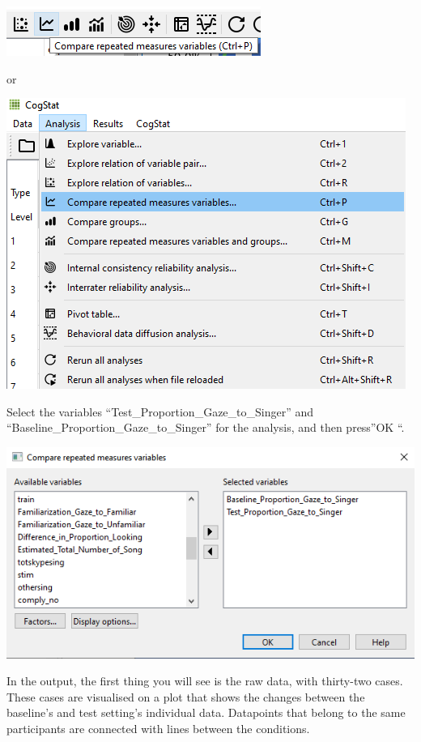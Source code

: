 \documentclass[
]{book}
\begin{document}
\includegraphics{img/ch6/6.7comparerepeatedmeasures_icon.png}

or

\includegraphics{img/ch6/6.7comparerepeatedmeasures_menu.png}

Select the variables ``Test\_Proportion\_Gaze\_to\_Singer'' and ``Baseline\_Proportion\_Gaze\_to\_Singer'' for the analysis, and then press''OK ``.

\includegraphics{img/ch6/6.7comparerepeatedmeasures_window.png}

In the output, the first thing you will see is the raw data, with thirty-two cases. These cases are visualised on a plot that shows the changes between the baseline's and test setting's individual data. Datapoints that belong to the same participants are connected with lines between the conditions.
\end{document}
